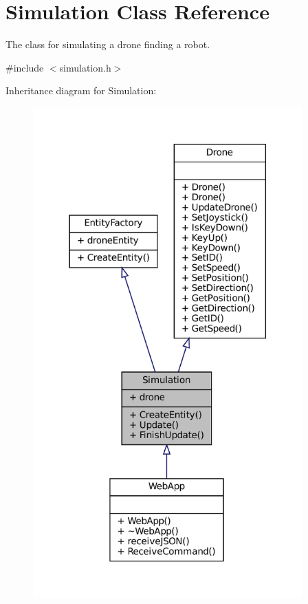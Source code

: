 \hypertarget{classSimulation}{}\section{Simulation Class Reference}
\label{classSimulation}


The class for simulating a drone finding a robot.  




{\ttfamily \#include $<$simulation.\+h$>$}



Inheritance diagram for Simulation\+:\nopagebreak
\begin{figure}[H]
\begin{center}
\leavevmode
\includegraphics[width=294pt]{classSimulation__inherit__graph}
\end{center}
\end{figure}


